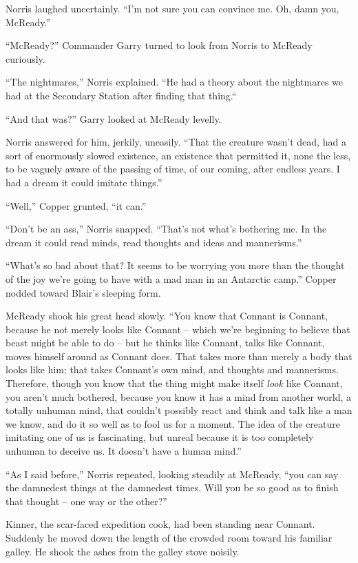 \documentclass[ebook,oneside,11pt]{memoir}				%
\begin{document}
Norris laughed uncertainly. ``I'm not sure you can convince me. Oh, damn you, McReady.''

``McReady?'' Commander Garry turned to look from Norris to McReady curiously.

``The nightmares,'' Norris explained. ``He had a theory about the nightmares we had at the Secondary Station after finding that thing.``

``And that was?'' Garry looked at McReady levelly.

Norris answered for him, jerkily, uneasily. ``That the creature wasn't dead, had a sort of enormously slowed existence, an existence that permitted it, none the less, to be vaguely aware of the passing of time, of our coming, after endless years. I had a dream it could imitate things.''

``Well,'' Copper grunted, ``it can.''

``Don't be an ass,'' Norris snapped. ``That's not what's bothering me. In the dream it could read minds, read thoughts and ideas and mannerisms.''

``What's so bad about that? It seems to be worrying you more than the thought of the joy we're going to have with a mad man in an Antarctic camp.'' Copper nodded toward Blair's sleeping form.

McReady shook his great head slowly. ``You know that Connant is Connant, because he not merely looks like Connant -- which we're beginning to believe that beast might be able to do -- but he thinks like Connant, talks like Connant, moves himself around as Connant does. That takes more than merely a body that looks like him; that takes Connant's own mind, and thoughts and mannerisms. Therefore, though you know that the thing might make itself \emph{look} like Connant, you aren't much bothered, because you know it has a mind from another world, a totally unhuman mind, that couldn't possibly react and think and talk like a man we know, and do it so well as to fool us for a moment. The idea of the creature imitating one of us is fascinating, but unreal because it is too completely unhuman to deceive us. It doesn't have a human mind.''

``As I said before,'' Norris repeated, looking steadily at McReady, ``you can say the damnedest things at the damnedest times. Will you be so good as to finish that thought -- one way or the other?''

Kinner, the scar-faced expedition cook, had been standing near Connant. Suddenly he moved down the length of the crowded room toward his familiar galley. He shook the ashes from the galley stove noisily.
\end{document}
